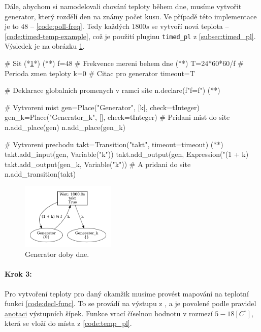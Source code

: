 Dále, abychom si namodelovali chování teploty během dne, musíme vytvořit generator, který rozdělí den na známy počet kusu. Ve případě této implementace je to $48$ -- \ref{code:poll-freq}. Tedy každých $1800s$ se vytvoří nová teplota -- \ref{code:timed-temp-example}, což je použití pluginu \texttt{timed\_pl} z \ref{subsec:timed_pl}. Výsledek je na obrázku \ref{therm-gen-viz}.

\begin{python}
  # Sit (*\ref{therm-gen-viz}*) (*\label{code:gen-therm-draw}*)
  f=48 # Frekvence mereni behem dne (*\label{code:poll-freq}*)
  T=24*60*60/f # Perioda zmen teploty
  k=0 # Citac pro generator
  timeout=T
  
  # Deklarace globalnich promenych v ramci site
  n.declare(f"f={f}") (*\label{code:snakes-glob-var}*)
  
  # Vytvoreni mist
  gen=Place("Generator", [k], check=tInteger)
  gen_k=Place("Generator_k", [], check=tInteger)
  # Pridani mist do site
  n.add_place(gen)
  n.add_place(gen_k)

  # Vytvoreni prechodu
  takt=Transition("takt", timeout=timeout) (*\label{code:timed-temp-example}*)
  takt.add_input(gen, Variable("k"))
  takt.add_output(gen, Expression("(1 + k) %
  takt.add_output(gen_k, Variable("k"))
  # A pridani do site
  n.add_transition(takt)
\end{python}

\begin{figure}[htb]
  \centering
  \includegraphics[width=0.4\textwidth]{obrazky-figures/therm-gen.png}
  \caption{Generator doby dne.}
  \label{therm-gen-viz}
\end{figure}

\paragraph{Krok 3:}
Pro vytvoření teploty pro daný okamžik musíme provést mapování na teplotní funkci \ref{code:decl-func}. To se provádí na výstupu z , a je povolené podle pravidel \href{https://www.ibisc.univ-evry.fr/~fpommereau/SNAKES/understanding-transition-firing.html}{anotaci} výstupních šípek. Funkce vrací číselnou hodnotu v rozmezí $5-18\left[C^{\circ}\right]$, která se vloží do místa  z \ref{code:temp_pl}.

